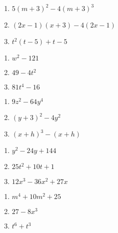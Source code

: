 \documentclass[11pt]{article}
\theoremstyle{definition}  %
\newcounter{HW}
\begin{document}
\begin{multicols}{3}
\begin{enumerate}
\setcounter{enumi}{\value{HW}}

\item $5(m+3)^2- 4(m+3)^3$
\item $(2x-1)(x+3) - 4(2x-1)$
\item $t^2(t-5) + t - 5$

\setcounter{HW}{\value{enumi}}
\end{enumerate}
\end{multicols}

\begin{multicols}{3}
\begin{enumerate}
\setcounter{enumi}{\value{HW}}

\item $w^2 - 121$
\item $49 - 4t^2$
\item $81t^4 - 16$

\setcounter{HW}{\value{enumi}}
\end{enumerate}
\end{multicols}

\begin{multicols}{3}
\begin{enumerate}
\setcounter{enumi}{\value{HW}}

\item $9z^2 - 64y^4$
\item $(y+3)^2 - 4y^2$
\item $(x+h)^3 - (x+h)$

\setcounter{HW}{\value{enumi}}
\end{enumerate}
\end{multicols}

\begin{multicols}{3}
\begin{enumerate}
\setcounter{enumi}{\value{HW}}

\item $y^2 - 24y + 144$
\item $25t^2 + 10t + 1$
\item $12x^3 - 36x^2 + 27x$

\setcounter{HW}{\value{enumi}}
\end{enumerate}
\end{multicols}

\begin{multicols}{3}
\begin{enumerate}
\setcounter{enumi}{\value{HW}}

\item $m^4 + 10m^2 + 25$
\item $27 - 8x^3$
\item $t^6 +t^3$


\setcounter{HW}{\value{enumi}}
\end{enumerate}
\end{multicols}
\end{document}

